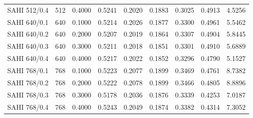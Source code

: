 \begin{tabular}{lllrrrrrr}
SAHI 512/0.4 & 512 & 0.4000 & 0.5241 & 0.2020 & 0.1883 & 0.3025 & 0.4913 & 4.5256 \\
SAHI 640/0.1 & 640 & 0.1000 & 0.5214 & 0.2026 & 0.1877 & 0.3300 & 0.4961 & 5.5462 \\
SAHI 640/0.2 & 640 & 0.2000 & 0.5207 & 0.2019 & 0.1864 & 0.3307 & 0.4904 & 5.8445 \\
SAHI 640/0.3 & 640 & 0.3000 & 0.5211 & 0.2018 & 0.1851 & 0.3301 & 0.4910 & 5.6889 \\
SAHI 640/0.4 & 640 & 0.4000 & 0.5217 & 0.2022 & 0.1852 & 0.3296 & 0.4790 & 5.1527 \\
SAHI 768/0.1 & 768 & 0.1000 & 0.5223 & 0.2077 & 0.1899 & 0.3469 & 0.4761 & 8.7382 \\
SAHI 768/0.2 & 768 & 0.2000 & 0.5222 & 0.2078 & 0.1899 & 0.3466 & 0.4805 & 8.8896 \\
SAHI 768/0.3 & 768 & 0.3000 & 0.5178 & 0.2036 & 0.1876 & 0.3339 & 0.4253 & 7.0187 \\
SAHI 768/0.4 & 768 & 0.4000 & 0.5243 & 0.2049 & 0.1874 & 0.3382 & 0.4314 & 7.3052 \\
\bottomrule
\end{tabular}
